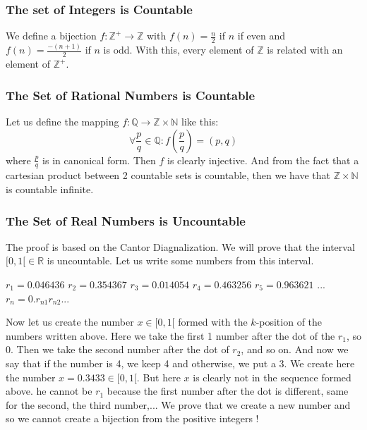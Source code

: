 \documentclass{article}
\begin{document}
\subsubsection{The set of Integers is Countable}
\begin{tcolorbox}[width=12.1cm]
We define a bijection $ f: \mathbb{Z^+} \rightarrow \mathbb{Z} $ with $ f(n) = \frac{n}{2} $ if $ n $ if even and $ f(n) = \frac{-(n+1)}{2} $ if $ n $ is odd. With this, every element of $ \mathbb{Z} $ is related with an element of $ \mathbb{Z^+} $.
\end{tcolorbox}

\subsubsection{The Set of Rational Numbers is Countable}
\begin{tcolorbox}[width=12.1cm]
Let us define the mapping $ f: \mathbb{Q} \rightarrow \mathbb{Z} \times \mathbb{N} $ like this:
\begin{equation}
\forall \frac{p}{q} \in \mathbb{Q} : f(\frac{p}{q}) = (p,q)
\end{equation}
where $ \frac{p}{q} $ is in canonical form. Then $ f $ is clearly injective. And from the fact that a cartesian product between 2 countable sets is countable, then we have that $ \mathbb{Z} \times \mathbb{N} $ is countable infinite.
\end{tcolorbox}


\subsubsection{The Set of Real Numbers is Uncountable}
\begin{tcolorbox}[width=12.1cm]
The proof is based on the Cantor Diagnalization. We will prove that the interval $ [0,1[ \in \mathbb{R} $ is uncountable. Let us write some numbers from this interval.
\begin{center}
$ r_1 = 0.046436 $
$ r_2 = 0.354367 $
$ r_3 = 0.014054 $
$ r_4 = 0.463256 $
$ r_5 = 0.963621 $
$ ... $
$ r_n = 0.r_{n1}r_{n2}... $
\end{center}
Now let us create the number $ x \in [0,1[ $ formed with the $ k $-position of the numbers written above. Here we take the first 1 number after the dot of the $ r_1 $, so 0. Then we take the second number after the dot of $ r_2 $, and so on. And now we say that if the number is 4, we keep 4 and otherwise, we put a 3. We create here the number $ x = 0.3433 \in [0,1[ $. But here $ x $ is clearly not in the sequence formed above. he cannot be $ r_1 $ because the first number after the dot is different, same for the second, the third number,... We prove that we create a new number and so we cannot create a bijection from the positive integers !
\end{tcolorbox}
\end{document}
